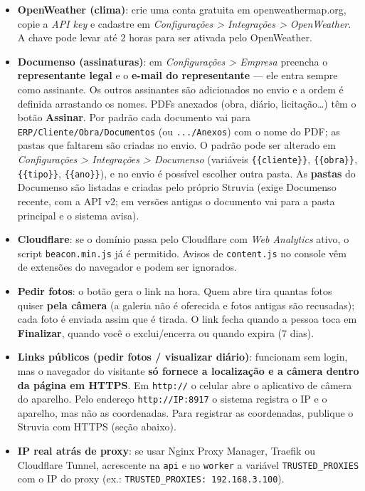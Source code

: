 \documentclass[
  10pt,
]{article}
\providecommand{\tightlist}{%
  \setlength{\itemsep}{0pt}\setlength{\parskip}{0pt}}
\begin{document}
\begin{itemize}
\tightlist
\item
  \textbf{OpenWeather (clima)}: crie uma conta gratuita em
  openweathermap.org, copie a \emph{API key} e cadastre em
  \emph{Configurações \textgreater{} Integrações \textgreater{}
  OpenWeather}. A chave pode levar até 2 horas para ser ativada pelo
  OpenWeather.
\item
  \textbf{Documenso (assinaturas)}: em \emph{Configurações
  \textgreater{} Empresa} preencha o \textbf{representante legal} e o
  \textbf{e-mail do representante} --- ele entra sempre como assinante.
  Os outros assinantes são adicionados no envio e a ordem é definida
  arrastando os nomes. PDFs anexados (obra, diário, licitação\ldots) têm
  o botão \textbf{Assinar}. Por padrão cada documento vai para
  \texttt{ERP/Cliente/Obra/Documentos} (ou \texttt{.../Anexos}) com o
  nome do PDF; as pastas que faltarem são criadas no envio. O padrão
  pode ser alterado em \emph{Configurações \textgreater{} Integrações
  \textgreater{} Documenso} (variáveis \texttt{\{\{cliente\}\}},
  \texttt{\{\{obra\}\}}, \texttt{\{\{tipo\}\}}, \texttt{\{\{ano\}\}}), e
  no envio é possível escolher outra pasta. As \textbf{pastas} do
  Documenso são listadas e criadas pelo próprio Struvia (exige Documenso
  recente, com a API v2; em versões antigas o documento vai para a pasta
  principal e o sistema avisa).
\item
  \textbf{Cloudflare}: se o domínio passa pelo Cloudflare com \emph{Web
  Analytics} ativo, o script \texttt{beacon.min.js} já é permitido.
  Avisos de \texttt{content.js} no console vêm de extensões do navegador
  e podem ser ignorados.
\item
  \textbf{Pedir fotos}: o botão gera o link na hora. Quem abre tira
  quantas fotos quiser \textbf{pela câmera} (a galeria não é oferecida e
  fotos antigas são recusadas); cada foto é enviada assim que é tirada.
  O link fecha quando a pessoa toca em \textbf{Finalizar}, quando você o
  exclui/encerra ou quando expira (7 dias).
\item
  \textbf{Links públicos (pedir fotos / visualizar diário)}: funcionam
  sem login, mas o navegador do visitante \textbf{só fornece a
  localização e a câmera dentro da página em HTTPS}. Em \texttt{http://}
  o celular abre o aplicativo de câmera do aparelho. Pelo endereço
  \texttt{http://IP:8917} o sistema registra o IP e o aparelho, mas não
  as coordenadas. Para registrar as coordenadas, publique o Struvia com
  HTTPS (seção abaixo).
\item
  \textbf{IP real atrás de proxy}: se usar Nginx Proxy Manager, Traefik
  ou Cloudflare Tunnel, acrescente na \texttt{api} e no \texttt{worker}
  a variável \texttt{TRUSTED\_PROXIES} com o IP do proxy (ex.:
  \texttt{TRUSTED\_PROXIES:\ 192.168.3.100}).
\end{itemize}
\end{document}
